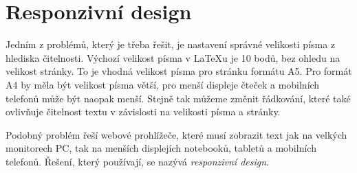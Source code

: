 \documentclass{csbulletin}
\newcommand\program[1]{#1}
\begin{document}







\section{Responzivní design}

Jedním z problémů, který je třeba řešit, je nastavení správné velikosti písma 
z hlediska čitelnosti. 
Výchozí velikost písma v \LaTeX u je 10 bodů, bez ohledu na velikost
stránky. To je vhodná velikost písma pro stránku formátu A5. Pro formát
A4 by měla být velikost písma větší, pro menší displeje čteček a mobilních
telefonů může být naopak menší. Stejně tak můžeme změnit řádkování,
které také ovlivňuje čitelnost textu v závislosti na velikosti písma a 
stránky.

Podobný problém řeší webové prohlížeče,
které musí zobrazit text jak na velkých monitorech PC, tak na
menších displejích notebooků, tabletů a mobilních telefonů. 
Řešení, který používají, se nazývá \textit{responzivní design}.
\end{document}
